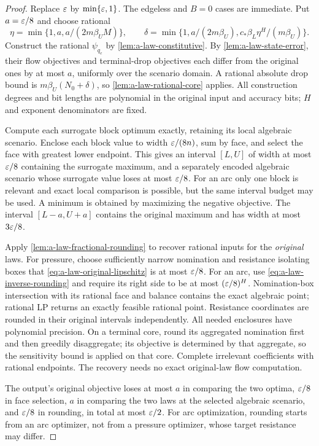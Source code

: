 \begin{proof}
Replace $\varepsilon$ by $\min\{\varepsilon,1\}$. The edgeless and $B=0$ cases are
immediate. Put $a=\varepsilon/8$ and choose rational
\[
 \eta=\min\{1,a,a/(2m\beta_U M)\},\qquad
 \delta=\min\{1,a/(2m\beta_U),
                     c_*\beta_L\eta^H/(m\beta_U)\}.
\]
Construct the rational $\psi_{q_e}$ by
\cref{lem:a-law-constitutive}. By \cref{lem:a-law-state-error}, their
flow objectives and terminal-drop objectives each differ from the
original ones by at most $a$, uniformly over the scenario domain. A rational absolute drop bound is
$m\beta_U(N_0+\delta)$, so \cref{lem:a-law-rational-core} applies.
All construction degrees and bit lengths are polynomial in the original
input and accuracy bits; $H$ and exponent denominators are fixed.

Compute each surrogate block optimum exactly, retaining its local
algebraic scenario. Enclose each block value to width
$\varepsilon/(8n)$, sum by face, and select the face with greatest lower
endpoint. This gives an interval $[L,U]$ of width at most $\varepsilon/8$
containing the surrogate maximum, and a separately encoded algebraic
scenario whose surrogate value loses at most $\varepsilon/8$. For an arc only
one block is relevant and exact local comparison is possible, but the
same interval budget may be used. A minimum is obtained by maximizing
the negative objective. The interval $[L-a,U+a]$ contains the original
maximum and has width at most $3\varepsilon/8$.

Apply \cref{lem:a-law-fractional-rounding} to recover rational inputs
for the \emph{original} laws.
For pressure, choose sufficiently narrow nomination and resistance
isolating boxes that \cref{eq:a-law-original-lipschitz} is at most
$\varepsilon/8$. For an arc, use \cref{eq:a-law-inverse-rounding} and require
its right side to be at most $(\varepsilon/8)^H$. Nomination-box intersection
with its rational face and balance contains the exact algebraic point;
rational LP returns an exactly feasible rational point. Resistance
coordinates are rounded in their original intervals independently.
All needed enclosures have polynomial precision. On a terminal core,
round its aggregated nomination first and then greedily disaggregate;
its objective is determined by that aggregate, so the sensitivity bound
is applied on that core. Complete irrelevant coefficients with rational
endpoints. The recovery needs no exact original-law flow computation.

The output's original objective loses at most $a$ in comparing the two
optima, $\varepsilon/8$ in face selection, $a$ in comparing the two laws at the
selected algebraic scenario, and $\varepsilon/8$ in rounding, in total at
most $\varepsilon/2$. For arc optimization, rounding starts from an arc
optimizer, not from a pressure optimizer, whose target resistance may
differ.
\end{proof}


